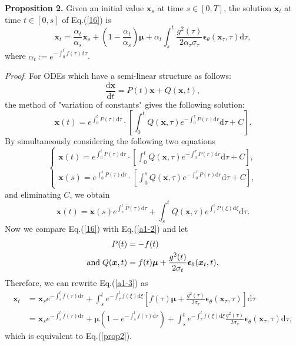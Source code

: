 \textbf{Proposition 2.} Given an initial value $\boldsymbol{x}_s$ at time $s\in[0,T]$, the solution $\boldsymbol{x}_t$ at time $t\in[0,s]$ of Eq.(\ref{16}) is 
\begin{equation}
\boldsymbol{x}_t=\frac{\alpha_t}{\alpha_s}\boldsymbol{x}_s+(1-\frac{\alpha_t}{\alpha_s})\boldsymbol{\mu}+\alpha_t\int_s^t
\frac{g^2(\tau)}{2\alpha_\tau\sigma_\tau}\boldsymbol{\epsilon}_\theta(\boldsymbol{x}_\tau,\tau)\mathrm{d}\tau, \label{prop2}
\end{equation}
where $\alpha_t:=e^{-\int_0^tf(\tau)\mathrm{d}\tau}$.

\textit{Proof}. For ODEs which have a semi-linear structure as follows:
\begin{equation}
\frac{\mathrm{d}\boldsymbol{x}}{\mathrm{d}t}=P(t)\boldsymbol{x}+Q(\boldsymbol{x},t), \label{a1-2}
\end{equation}
the method of "variation of constants" gives the following solution:
\begin{equation*}
\boldsymbol{x}(t)=e^{\int_0^tP(\tau)\mathrm{d}\tau}\cdot \left[\int_0^tQ(\boldsymbol{x},\tau)e^{-\int_0^\tau P(r)\mathrm{d}r}\mathrm{d}\tau+C \right]. 
\end{equation*}
By simultaneously considering the following two equations
\begin{equation*}
\begin{cases}
    \boldsymbol{x}(t)=e^{\int_0^tP(\tau)\mathrm{d}\tau}\cdot \left[\int_0^tQ(\boldsymbol{x},\tau)e^{-\int_0^\tau P(r)\mathrm{d}r}\mathrm{d}\tau+C \right],\\
    \boldsymbol{x}(s)=e^{\int_0^sP(\tau)\mathrm{d}\tau}\cdot \left[\int_0^sQ(\boldsymbol{x},\tau)e^{-\int_0^\tau P(r)\mathrm{d}r}\mathrm{d}\tau+C \right],
\end{cases}
\end{equation*}
and eliminating $C$, we obtain
\begin{equation}
\boldsymbol{x}(t)=\boldsymbol{x}(s)e^{\int_s^tP(\tau)\mathrm{d}\tau}+ \int_s^tQ(\boldsymbol{x},\tau)e^{\int_\tau^t P(\xi)\mathrm{d}\xi}\mathrm{d}\tau.
\label{a1-3}
\end{equation}
Now we compare Eq.(\ref{16}) with Eq.(\ref{a1-2}) and let 
\begin{align*}
    P(t)&=-f(t)\\
   \text{and\;} Q(\boldsymbol{x},t)&=f(t)\boldsymbol{\mu}+\frac{g^2(t)}{2\sigma_t}\boldsymbol{\epsilon}_\theta(\boldsymbol{x}_t,t).
\end{align*}
Therefore, we can rewrite Eq.(\ref{a1-3}) as
\begin{align*}
\boldsymbol{x}_t&=\boldsymbol{x}_se^{-\int_s^tf(\tau)\mathrm{d}\tau}+ \int_s^te^{-\int_\tau^tf(\xi)\mathrm{d}\xi}
\left[f(\tau)\boldsymbol{\mu}+\frac{g^2(\tau)}{2\sigma_\tau}\boldsymbol{\epsilon}_\theta(\boldsymbol{x}_\tau,\tau)\right]\mathrm{d}\tau\\
&=\boldsymbol{x}_se^{-\int_s^tf(\tau)\mathrm{d}\tau}+\boldsymbol{\mu}(1-e^{-\int_s^tf(\tau)\mathrm{d}\tau})+\int_s^te^{-\int_\tau^tf(\xi)\mathrm{d}\xi}
\frac{g^2(\tau)}{2\sigma_\tau}\boldsymbol{\epsilon}_\theta(\boldsymbol{x}_\tau,\tau)\mathrm{d}\tau,
\end{align*}
which is equivalent to Eq.(\ref{prop2}).

